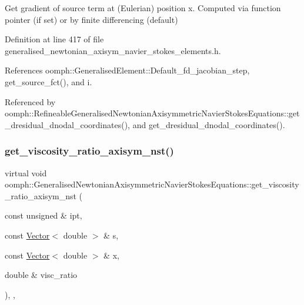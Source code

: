 Get gradient of source term at (Eulerian) position x. Computed via function pointer (if set) or by finite differencing (default) 

Definition at line 417 of file generalised\+\_\+newtonian\+\_\+axisym\+\_\+navier\+\_\+stokes\+\_\+elements.\+h.



References oomph\+::\+Generalised\+Element\+::\+Default\+\_\+fd\+\_\+jacobian\+\_\+step, get\+\_\+source\+\_\+fct(), and i.



Referenced by oomph\+::\+Refineable\+Generalised\+Newtonian\+Axisymmetric\+Navier\+Stokes\+Equations\+::get\+\_\+dresidual\+\_\+dnodal\+\_\+coordinates(), and get\+\_\+dresidual\+\_\+dnodal\+\_\+coordinates().

\mbox{\label{classoomph_1_1GeneralisedNewtonianAxisymmetricNavierStokesEquations_a955bccd22242be81a5ee731a8731438a}} 
\subsubsection{\texorpdfstring{get\+\_\+viscosity\+\_\+ratio\+\_\+axisym\+\_\+nst()}{get\_viscosity\_ratio\_axisym\_nst()}}
{\footnotesize\ttfamily virtual void oomph\+::\+Generalised\+Newtonian\+Axisymmetric\+Navier\+Stokes\+Equations\+::get\+\_\+viscosity\+\_\+ratio\+\_\+axisym\+\_\+nst (\begin{DoxyParamCaption}\item[{const unsigned \&}]{ipt,  }\item[{const \hyperlink{classoomph_1_1Vector}{Vector}$<$ double $>$ \&}]{s,  }\item[{const \hyperlink{classoomph_1_1Vector}{Vector}$<$ double $>$ \&}]{x,  }\item[{double \&}]{visc\+\_\+ratio }\end{DoxyParamCaption})\hspace{0.3cm}{\ttfamily [inline]}, {\ttfamily [protected]}, {\ttfamily [virtual]}}



